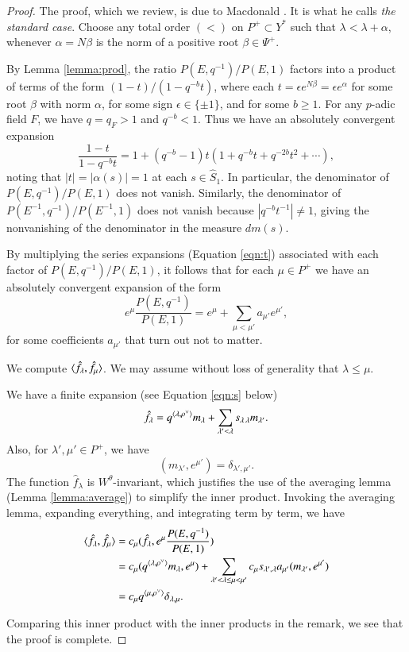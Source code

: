 \begin{proof}  
The proof, which we review, is due to Macdonald \cite[Ch.V]{macdonaldspherical}.
It is what he calls {\it the standard case}.  
Choose any total order $(<)$ on $P^+\subset Y^*$ such that 
$\lambda < \lambda + \alpha$, whenever $\alpha = N\beta$ is the norm of a positive root $\beta\in\Psi^+$.

By Lemma \ref{lemma:prod},
the ratio $P(E,q^{-1})/P(E,1)$  factors into a product of terms of the form $(1- t)/(1- q^{-b} t)$, 
where each $t = \epsilon e^{N\beta} = \epsilon e^\alpha$ for
some root $\beta$ with norm $\alpha$, 
for some sign $\epsilon\in \{\pm 1\}$, and for some $b\ge 1$.
For any $p$-adic field $F$, we have $q = q_F > 1$ and $q^{-b} < 1$.  Thus we have an absolutely convergent 
expansion
\begin{equation}\label{eqn:t}
\frac{1- t}{1- q^{-b} t} = 1 + (q^{-b}-1) t (1+ q^{-b} t + q^{-2b} t^2 + \cdots),
\end{equation}
noting that $|t| = |\alpha(s)|=1$ at each $s\in \hat S_1$.  In particular, the denominator of $P(E,q^{-1})/P(E,1)$ does not
vanish.  Similarly, the
denominator of $P(E^{-1},q^{-1})/P(E^{-1},1)$ does not vanish because $|q^{-b} t^{-1}|\ne1$, giving the nonvanishing of the
denominator in the measure $dm(s)$.

By multiplying the series expansions (Equation \ref{eqn:t}) associated with each factor of $P(E,q^{-1})/P(E,1)$,
it follows that for each $\mu\in P^+$ we have an absolutely convergent expansion of the form
\[
e^\mu \frac{P(E,q^{-1})}{P(E,1)} = e^\mu +\sum_{\mu< \mu'} a_{\mu'} e^{\mu'},
\] 
for some coefficients $a_{\mu'}$ that turn out not to matter.

We compute $\langle{\hat f_\lambda,\hat f_\mu}\rangle$.
We may assume without loss of generality that $\lambda \le \mu$.

We have a finite expansion (see Equation \ref{eqn:s} below)
\[
\hat f_\lambda = q^{\langle{\lambda,\rho^\vee}\rangle} m_\lambda + \sum_{\lambda' <\lambda } s_{\lambda\,\lambda} m_{\lambda'}.
\]
Also, for $\lambda',\mu'\in P^+$, we have
\[
(m_{\lambda'},e^{\mu'}) = \delta_{\lambda',{\mu'}}.
\]
The function $\hat f_\lambda$ is $W^\theta$-invariant, which justifies the use of 
the averaging lemma (Lemma \ref{lemma:average}) to simplify the inner product.
Invoking the averaging lemma, expanding everything, and integrating term by term, we have
\begin{align*}
\langle{\hat f_\lambda,\hat f_\mu}\rangle &= c_\mu (\hat f_\lambda, e^\mu \frac{ P(E,q^{-1})}{P(E,1)})\\
&= c_\mu (q^{\langle{\lambda,\rho^\vee}\rangle} m_\lambda,e^\mu) + \sum_{\lambda' < \lambda\le\mu < \mu'}
c_\mu s_{\lambda',\lambda} a_{\mu'} (m_{\lambda'},e^{\mu'})\\ 
&= c_\mu q^{\langle{\mu,\rho^\vee}\rangle} \delta_{\lambda,\mu}.
\end{align*}

Comparing this inner product with the  inner products in the remark, we see that the proof is 
complete.
\end{proof}





